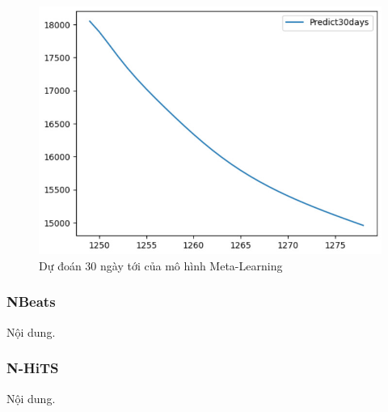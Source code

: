 \begin{figure}[H]
\begin{minipage}{0.15\textwidth}
    \includegraphics[width=1\textwidth]{resources/chapter-5/predicted/EXB_LSTM_9_1_next30days.jpg}
    \end{minipage}
    \hfill
    
    \caption{Dự đoán 30 ngày tới của mô hình Meta-Learning}
    \label{fig:ml_predicted}
\end{figure}





\subsubsection{NBeats}
Nội dung.




\subsubsection{N-HiTS}
Nội dung.


